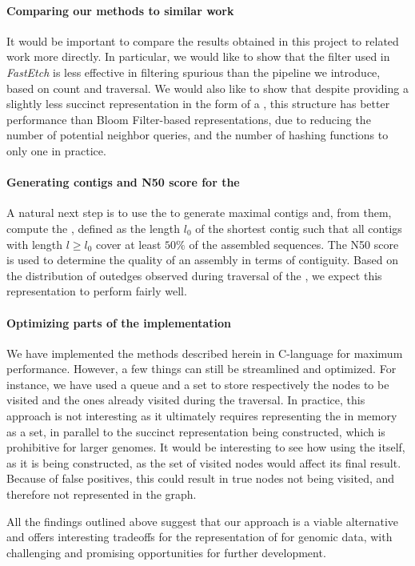 \paragraph*{Comparing our methods to similar work}

It would be important to compare the results obtained in this project to related work more directly. In particular, we would like to show that the  filter used in \emph{FastEtch} is less effective in filtering spurious  than the pipeline we introduce, based on count and traversal. We would also like to show that despite providing a slightly less succinct \dBG representation in the form of a \dBHT, this structure has better performance than Bloom Filter-based representations, due to reducing the number of potential neighbor queries, and the number of hashing functions to only one in practice.

\paragraph*{Generating contigs and N50 score for the \dBHT}

A natural next step is to use the \dBHT to generate maximal contigs and, from them, compute the , defined as the length $l_0$ of the shortest contig such that all contigs with length $l \geq l_0$ cover at least $50\%$ of the assembled sequences. The N50 score is used to determine the quality of an assembly in terms of contiguity. Based on the distribution of outedges observed during traversal of the \dBHT, we expect this representation to perform fairly well.

\paragraph*{Optimizing parts of the implementation}

We have implemented the methods described herein in C-language for maximum performance. However, a few things can still be streamlined and optimized.
For instance, we have used a queue and a set to store respectively the nodes to be visited and the ones already visited during the \dBCM traversal. In practice, this approach is not interesting as it ultimately requires representing the \dBG in memory as a set, in parallel to the succinct representation being constructed, which is prohibitive for larger genomes. It would be interesting to see how using the \dBHT itself, as it is being constructed, as the set of visited nodes would affect its final result. Because of false positives, this could result in true nodes not being visited, and therefore not represented in the graph. 

\medskip

All the findings outlined above suggest that our approach is a viable alternative and offers interesting tradeoffs for the representation of  for genomic data, with challenging and promising opportunities for further development.

